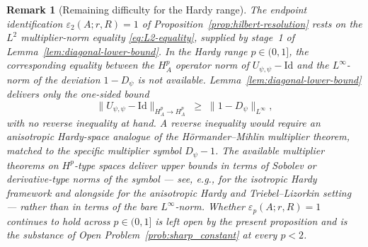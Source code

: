 \documentclass[pdflatex,sn-basic,Numbered]{sn-jnl}
\theoremstyle{thmstyleone}%
\theoremstyle{thmstylethree}%
\newtheorem{remark}{Remark}%
\begin{document}
\begin{remark}[Remaining difficulty for the Hardy range]\label{rem:remaining-difficulty}
	The endpoint identification $\varepsilon_2(A; r, R) = 1$ of
	Proposition~\ref{prop:hilbert-resolution} rests on the $L^2$
	multiplier-norm equality \eqref{eq:L2-equality}, supplied by stage~1 of
	Lemma~\ref{lem:diagonal-lower-bound}. In the Hardy range
	$p \in (0, 1]$, the corresponding equality between the
	$H^p_A$ operator norm of $U_{\psi, \psi} - \mathrm{Id}$ and the
	$L^\infty$-norm of the deviation $1 - D_\psi$ is not available.
	Lemma~\ref{lem:diagonal-lower-bound} delivers only the one-sided
	bound
	\begin{equation}\label{eq:hp-onesided}
		\bigl\| U_{\psi, \psi} - \mathrm{Id} \bigr\|_{H^p_A \to H^p_A}
		\;\ge\; \bigl\| 1 - D_\psi \bigr\|_{L^\infty} ,
	\end{equation}
	with no reverse inequality at hand. A reverse inequality would
	require an anisotropic Hardy-space analogue of the
	H\"ormander--Mihlin multiplier theorem, matched to the specific
	multiplier symbol $D_\psi - 1$. The available multiplier theorems
	on $H^p$-type spaces deliver upper bounds in terms of Sobolev or
	derivative-type norms of the symbol --- see, e.g.,
	\cite[Section~2, Theorem~2.6.2]{Triebel1983} for the isotropic Hardy framework
	and \cite[Chapter~1, Section~9]{Bownik2003} alongside \cite[Section~4]{Bownik2007} for the anisotropic Hardy and Triebel--Lizorkin
	setting --- rather than 
	in terms of the bare $L^\infty$-norm.
	Whether $\varepsilon_p(A; r, R) = 1$ continues to hold across
	$p \in (0, 1]$ is left open by the present proposition and is the
	substance of Open Problem~\ref{prob:sharp_constant} at every
	$p < 2$.
\end{remark}
\end{document}
